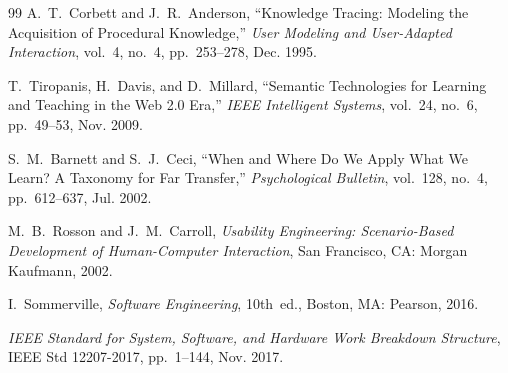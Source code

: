 \documentclass[11pt,a4paper]{article}
\begin{document}
\begin{thebibliography}{99}
A.~T.~Corbett and J.~R.~Anderson, ``Knowledge Tracing: Modeling the Acquisition of Procedural Knowledge,'' \emph{User Modeling and User-Adapted Interaction}, vol.~4, no.~4, pp.~253--278, Dec. 1995.

T.~Tiropanis, H.~Davis, and D.~Millard, ``Semantic Technologies for Learning and Teaching in the Web 2.0 Era,'' \emph{IEEE Intelligent Systems}, vol.~24, no.~6, pp.~49--53, Nov. 2009.

S.~M.~Barnett and S.~J.~Ceci, ``When and Where Do We Apply What We Learn? A Taxonomy for Far Transfer,'' \emph{Psychological Bulletin}, vol.~128, no.~4, pp.~612--637, Jul. 2002.

M.~B.~Rosson and J.~M.~Carroll, \emph{Usability Engineering: Scenario-Based Development of Human-Computer Interaction}, San Francisco, CA: Morgan Kaufmann, 2002.

I.~Sommerville, \emph{Software Engineering}, 10th~ed., Boston, MA: Pearson, 2016.

\emph{IEEE Standard for System, Software, and Hardware Work Breakdown Structure}, IEEE Std 12207-2017, pp.~1--144, Nov. 2017.

\end{thebibliography}
\end{document}
